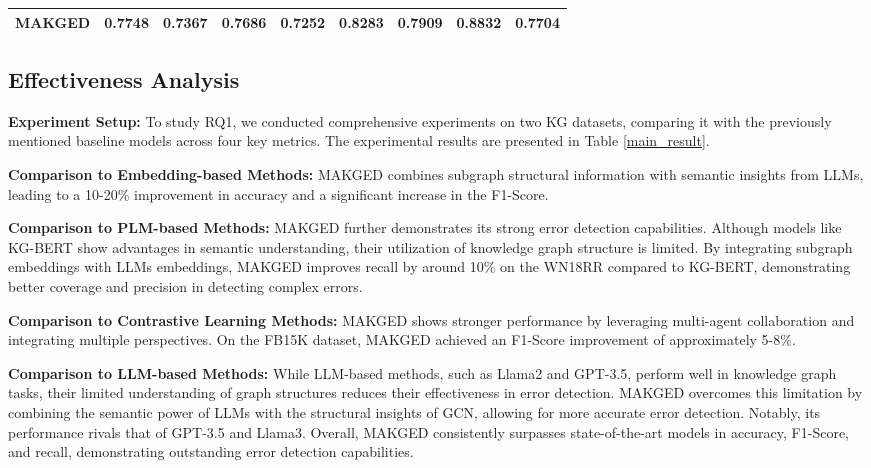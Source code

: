 \begin{table}[t]
\begin{center}
{\begin{tabular}{lcccccccc}
        MAKGED & \textbf{0.7748} & \textbf{0.7367} & \textbf{0.7686} & \textbf{0.7252} & \textbf{0.8283} & \textbf{0.7909} & \textbf{0.8832} & \textbf{0.7704} \\


        \bottomrule

        \end{tabular}
    }
\end{center}
\end{table}


\subsection{Effectiveness Analysis}
\noindent\textbf{Experiment Setup:}
To study RQ1, we conducted comprehensive experiments on two KG datasets, comparing it with the previously mentioned baseline models across four key metrics. The experimental results are presented in Table \ref{main_result}.


\noindent\textbf{Comparison to Embedding-based Methods:} MAKGED combines subgraph structural information with semantic insights from LLMs, leading to a 10-20\% improvement in accuracy and a significant increase in the F1-Score. 


\noindent\textbf{Comparison to PLM-based Methods: } 
MAKGED further demonstrates its strong error detection capabilities. Although models like KG-BERT show advantages in semantic understanding, their utilization of knowledge graph structure is limited. By integrating subgraph embeddings with LLMs embeddings, MAKGED improves recall by around 10\% on the WN18RR compared to KG-BERT, demonstrating better coverage and precision in detecting complex errors.

\noindent\textbf{Comparison to Contrastive Learning Methods:} MAKGED shows stronger performance by leveraging multi-agent collaboration and integrating multiple perspectives. On the FB15K dataset, MAKGED achieved an F1-Score improvement of approximately 5-8\%. 

\noindent\textbf{Comparison to LLM-based Methods:} 
While LLM-based methods, such as Llama2 and GPT-3.5, perform well in knowledge graph tasks, their limited understanding of graph structures reduces their effectiveness in error detection. MAKGED overcomes this limitation by combining the semantic power of LLMs with the structural insights of GCN, allowing for more accurate error detection. Notably, its performance rivals that of GPT-3.5 and Llama3. 
Overall, MAKGED consistently surpasses state-of-the-art models in accuracy, F1-Score, and recall, demonstrating outstanding error detection capabilities.


